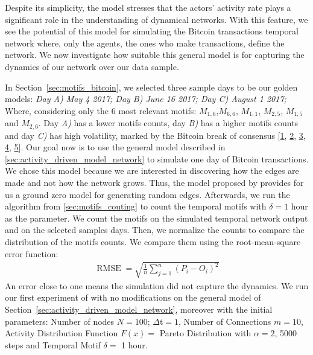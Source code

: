 \documentclass[../../thesis.tex]{subfiles}
\begin{document}
Despite its simplicity, the model stresses that the actors’ activity rate plays a significant role in the understanding of dynamical networks. With this feature, we see the potential of this model for simulating the Bitcoin transactions temporal network where, only the agents, the ones who make transactions, define the network. We now investigate how suitable this general model is for capturing the dynamics of our network over our data sample.

In Section~\ref{sec:motifs_bitcoin}, we selected three sample days to be our golden models: \textit{Day A) May 4 2017; Day B) June 16 2017; Day C) August 1 2017;} Where, considering only the 6 most relevant motifs: $M_{1,6}$,$M_{6,6}$, $M_{1,1}$, $M_{2,5}$, $M_{1,5}$ and $M_{2,6}$. Day \textit{A)} has a lower motifs counts, day \textit{B)} has a higher motifs counts and day \textit{C)} has high volatility, marked by the Bitcoin break of consensus [\href{https://www.cnbc.com/2017/07/31/blockchain-fork-will-create-new-digital-crypto-currency-bitcoin-cash.html}{1}, \href{https://www.theverge.com/2017/8/1/16075276/bitcoin-cash-hard-fork-coinbase}{2}, \href{https://motherboard.vice.com/en_us/article/9kwepa/bitcoin-has-forked}{3}, \href{https://techcrunch.com/2017/08/02/wtf-is-bitcoin-cash-and-is-it-worth-anything/}{4}, \href{http://money.cnn.com/2017/08/01/technology/business/bitcoin-cash-new-currency/index.html}{5}]. Our goal now is to use the general model described in \ref{sec:activity_driven_model_network} to simulate one day of Bitcoin transactions. We chose this model because we are interested in discovering how the edges are made and not how the network grows. Thus, the model proposed by \cite{perra2012activity} provides for us a ground zero model for generating random edges. Afterwards, we run the algorithm from \ref{sec:motifs_couting} to count the temporal motifs with $\delta = 1$ hour as the parameter. We count the motifs on the simulated temporal network output and on the selected samples days. Then, we normalize the counts to compare the distribution of the motifs counts. We compare them using the root-mean-square error function: 
\begin{equation} 
\label{eq1}
\begin{split}
\operatorname{RMSE}= \sqrt{\frac{1}{n}\sum_{j=1}^{n}{(P_{i}-O_{i})}^{2}}
\end{split}
\end{equation}
An error close to one means the simulation did not capture the dynamics. We run our first experiment of with no modifications on the general model of Section~\ref{sec:activity_driven_model_network}, moreover with the initial parameters: Number of nodes $N=100$; $\Delta$t$=1$, Number of Connections $m=10$, Activity Distribution Function $F(x)=$ Pareto Distribution with $\alpha=2$, 5000 steps and Temporal Motif $\delta=$ 1 hour. 
\end{document}
